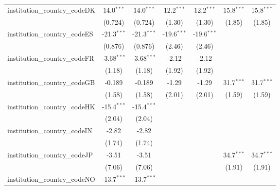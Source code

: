 \begin{tabular}{lcccccc}
   institution\_country\_codeDK          & 14.0$^{***}$  & 14.0$^{***}$  & 12.2$^{***}$  & 12.2$^{***}$  & 15.8$^{***}$  & 15.8$^{***}$\\   
                                         & (0.724)       & (0.724)       & (1.30)        & (1.30)        & (1.85)        & (1.85)\\   
   institution\_country\_codeES          & -21.3$^{***}$ & -21.3$^{***}$ & -19.6$^{***}$ & -19.6$^{***}$ &               &   \\   
                                         & (0.876)       & (0.876)       & (2.46)        & (2.46)        &               &   \\   
   institution\_country\_codeFR          & -3.68$^{***}$ & -3.68$^{***}$ & -2.12         & -2.12         &               &   \\   
                                         & (1.18)        & (1.18)        & (1.92)        & (1.92)        &               &   \\   
   institution\_country\_codeGB          & -0.189        & -0.189        & -1.29         & -1.29         & 31.7$^{***}$  & 31.7$^{***}$\\   
                                         & (1.58)        & (1.58)        & (2.01)        & (2.01)        & (1.59)        & (1.59)\\   
   institution\_country\_codeHK          & -15.4$^{***}$ & -15.4$^{***}$ &               &               &               &   \\   
                                         & (2.04)        & (2.04)        &               &               &               &   \\   
   institution\_country\_codeIN          & -2.82         & -2.82         &               &               &               &   \\   
                                         & (1.74)        & (1.74)        &               &               &               &   \\   
   institution\_country\_codeJP          & -3.51         & -3.51         &               &               & 34.7$^{***}$  & 34.7$^{***}$\\   
                                         & (7.06)        & (7.06)        &               &               & (1.91)        & (1.91)\\   
   institution\_country\_codeNO          & -13.7$^{***}$ & -13.7$^{***}$ &               &               &               &   \\   

\end{tabular}
